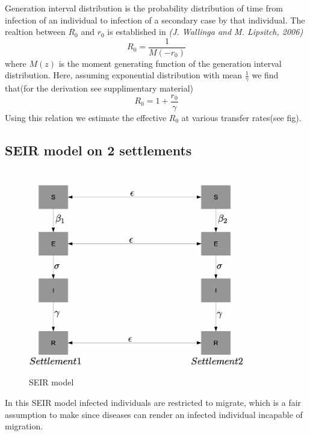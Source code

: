 \documentclass{article}
\begin{document}
Generation interval distribution is the probability distribution of
time from infection of an individual to infection of a secondary case
by that individual. The realtion between $R_{0}$ and $r_{0}$ is
established in \textit{(J. Wallinga and M. Lipsitch, 2006)}
\begin{equation}
R_{0}=\frac{1}{M(-r_{0})}
\end{equation}
where $M(z)$ is the moment generating
function of the generation interval distribution. Here, assuming
exponential distribution with mean $\frac{1}{\gamma}$ we find that(for
the derivation see supplimentary
material) $$R_{0}=1+\frac{r_{0}}{\gamma}$$ Using this relation we
estimate the effective $R_{0}$ at various transfer rates(see fig).                                               %
\subsection{SEIR model on 2 settlements}

\begin{figure}[h!]
  \includegraphics[width=\linewidth]{Figures_Tables/seir_im.eps}
   \caption{SEIR model}
  \label{fig:SIR_des}
\end{figure}

In this SEIR model infected individuals are restricted to migrate,
which is a fair assumption to make since diseases can render an
infected individual incapable of migration.
\end{document}
